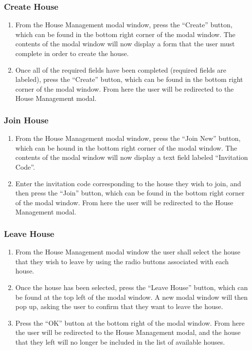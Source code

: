 \documentclass[12pt]{article}
\begin{document}
    \subsubsection{Create House}
    \begin{enumerate}
        \item From the House Management modal window, press the ``Create'' button, which can be found in the bottom right corner of the modal window. The contents of the modal window will now display a form that the user must complete in order to create the house.
        \item Once all of the required fields have been completed (required fields are labeled), press the ``Create'' button, which can be found in the bottom right corner of the modal window. From here the user will be redirected to the House Management modal.
    \end{enumerate}

    \subsubsection{Join House}
    \begin{enumerate}
        \item From the House Management modal window, press the ``Join New'' button, which can be hound in the bottom right corner of the modal window. The contents of the modal window will now display a text field labeled ``Invitation Code''.
        \item Enter the invitation code corresponding to the house they wish to join, and then press the ``Join'' button, which can be found in the bottom right corner of the modal window. From here the user will be redirected to the House Management modal.
    \end{enumerate}

    \subsubsection{Leave House}
    \begin{enumerate}
        \item From the House Management modal window the user shall select the house that they wish to leave by using the radio buttons associated with each house.
        \item Once the house has been selected, press the ``Leave House'' button, which can be found at the top left of the modal window. A new modal window will then pop up, asking the user to confirm that they want to leave the house.
        \item Press the ``OK'' button at the bottom right of the modal window. From here the user will be redirected to the House Management modal, and the house that they left will no longer be included in the list of available houses.
    \end{enumerate}
\end{document}
